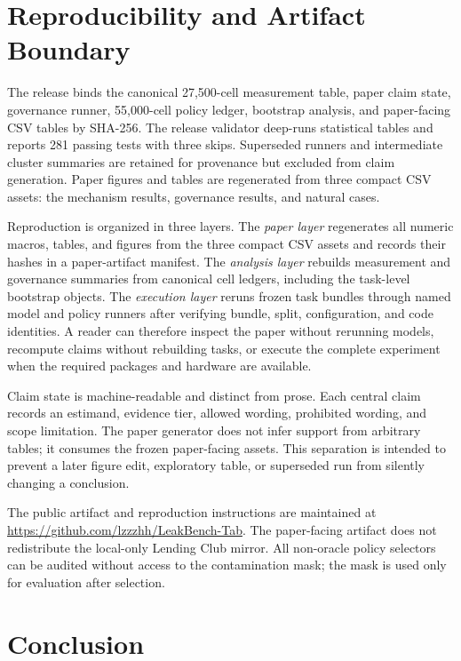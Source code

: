 \documentclass[sigconf,review]{acmart}
\begin{document}
\section{Reproducibility and Artifact Boundary}

The release binds the canonical 27,500-cell measurement table, paper claim
state, governance runner, 55,000-cell policy ledger, bootstrap analysis, and
paper-facing CSV tables by SHA-256. The release validator deep-runs statistical
tables and reports 281 passing tests with three skips. Superseded runners and
intermediate cluster summaries are retained for provenance but excluded from
claim generation. Paper figures and tables are regenerated from three compact
CSV assets: the mechanism results, governance results, and natural cases.

Reproduction is organized in three layers. The \emph{paper layer} regenerates
all numeric macros, tables, and figures from the three compact CSV assets and
records their hashes in a paper-artifact manifest. The \emph{analysis layer}
rebuilds measurement and governance summaries from canonical cell ledgers,
including the task-level bootstrap objects. The \emph{execution layer} reruns
frozen task bundles through named model and policy runners after verifying
bundle, split, configuration, and code identities. A reader can therefore
inspect the paper without rerunning models, recompute claims without rebuilding
tasks, or execute the complete experiment when the required packages and
hardware are available.

Claim state is machine-readable and distinct from prose. Each central claim
records an estimand, evidence tier, allowed wording, prohibited wording, and
scope limitation. The paper generator does not infer support from arbitrary
tables; it consumes the frozen paper-facing assets. This separation is intended
to prevent a later figure edit, exploratory table, or superseded run from
silently changing a conclusion.

The public artifact and reproduction instructions are maintained at
\url{https://github.com/lzzzhh/LeakBench-Tab}. The paper-facing artifact does
not redistribute the local-only Lending Club mirror. All non-oracle policy
selectors can be audited without access to the contamination mask; the mask is
used only for evaluation after selection.

\section{Conclusion}
\end{document}
